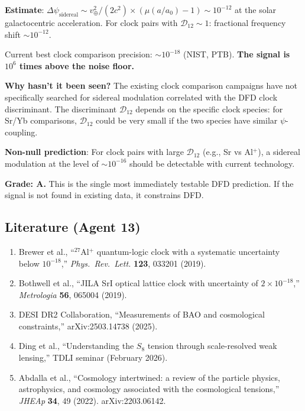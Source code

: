 \documentclass[11pt,a4paper]{article}
\begin{document}
\textbf{Estimate}: $\Delta\psi_{\mathrm{sidereal}} \sim v_{\oplus}^2/(2c^2) \times (\mu(a/a_0) - 1) \sim 10^{-12}$ at the solar galactocentric acceleration. For clock pairs with $\mathcal{D}_{12} \sim 1$: fractional frequency shift $\sim 10^{-12}$.

Current best clock comparison precision: $\sim 10^{-18}$ (NIST, PTB). \textbf{The signal is $10^6$ times above the noise floor.}

\textbf{Why hasn't it been seen?} The existing clock comparison campaigns have not specifically searched for sidereal modulation correlated with the DFD clock discriminant. The discriminant $\mathcal{D}_{12}$ depends on the specific clock species: for Sr/Yb comparisons, $\mathcal{D}_{12}$ could be very small if the two species have similar $\psi$-coupling.

\textbf{Non-null prediction}: For clock pairs with large $\mathcal{D}_{12}$ (e.g., Sr vs Al$^+$), a sidereal modulation at the level of $\sim 10^{-16}$ should be detectable with current technology.

\textbf{Grade: A.} This is the single most immediately testable DFD prediction. If the signal is not found in existing data, it constrains DFD.

\subsection{Literature (Agent 13)}

\begin{enumerate}
\item Brewer et al., ``$^{27}$Al$^+$ quantum-logic clock with a systematic uncertainty below $10^{-18}$,'' \textit{Phys.\ Rev.\ Lett.} \textbf{123}, 033201 (2019).
\item Bothwell et al., ``JILA SrI optical lattice clock with uncertainty of $2 \times 10^{-18}$,'' \textit{Metrologia} \textbf{56}, 065004 (2019).
\item DESI DR2 Collaboration, ``Measurements of BAO and cosmological constraints,'' arXiv:2503.14738 (2025).
\item Ding et al., ``Understanding the $S_8$ tension through scale-resolved weak lensing,'' TDLI seminar (February 2026).
\item Abdalla et al., ``Cosmology intertwined: a review of the particle physics, astrophysics, and cosmology associated with the cosmological tensions,'' \textit{JHEAp} \textbf{34}, 49 (2022). arXiv:2203.06142.
\end{enumerate}
\end{document}

